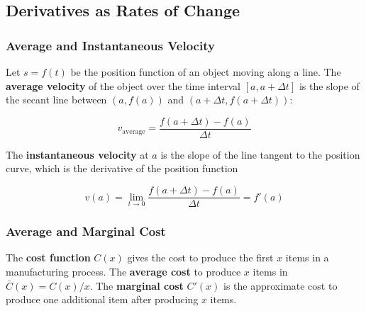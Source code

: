 %
%
%

\subsection{Derivatives as Rates of Change}
\subsubsection{Average and Instantaneous Velocity}
Let $s = f(t)$ be the position function of an object moving along a line. The \textbf{average velocity} of the object over the time interval $[a, a + \Delta t]$ is the slope of the secant line between $(a, f(a))$ and $(a + \Delta t, f(a + \Delta t))$:

\begin{equation}
    v_\text{average} = \frac{f(a + \Delta t) - f(a)}{\Delta t}
\end{equation}

The \textbf{instantaneous velocity} at $a$ is the slope of the line tangent to the position curve, which is the derivative of the position function

\begin{equation}
    v(a) = \lim_{t \rightarrow 0} \frac{f(a + \Delta t) - f(a)}{\Delta t} = f'(a)
\end{equation}

\subsubsection{Average and Marginal Cost}
The \textbf{cost function} $C(x)$ gives the cost to produce the first $x$ items in a manufacturing process. The \textbf{average cost} to produce $x$ items in $\bar{C}(x) = C(x)/x$. The \textbf{marginal cost} $C'(x)$ is the approximate cost to produce one additional item after producing $x$ items.
